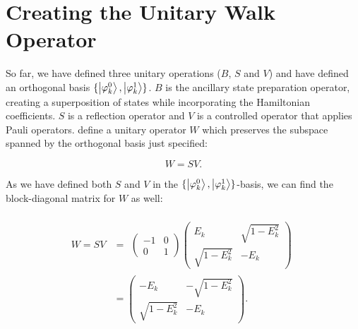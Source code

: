 \section{Creating the Unitary Walk Operator}

So far, we have defined three unitary operations ($B$, $S$ and $V$) and have defined an orthogonal basis $\{\left\vert{\varphi_k^0}\right\rangle, \left\vert{\varphi^1_k}\right\rangle\}$. $B$ is the ancillary state preparation operator, creating a superposition of states while incorporating the Hamiltonian coefficients. $S$ is a reflection operator and $V$ is a controlled operator that applies Pauli operators.
\textcite{poulin} define a unitary operator $W$ which preserves the subspace spanned by the orthogonal basis just specified:


%
%

\begin{equation}
W = SV.
\end{equation}

As we have defined both $S$ and $V$ in the $\{\left\vert{\varphi_k^0}\right\rangle, \left\vert{\varphi^1_k}\right\rangle\}$-basis, we can find the block-diagonal matrix for $W$ as well:

\begin{align} \begin{split}
W = SV &=
\begin{array}{l}
\left(\begin{array}{cc}
-1 & 0 \\
0 & 1
\end{array}\right) \left(\begin{array}{cc}
E_{k} & \sqrt{1-E_{k}^{2}} \\
\sqrt{1-E_{k}^{2}} & -E_{k}
\end{array}\right)
\end{array} \\
&= \left(\begin{array}{cc}
-E_{k} & -\sqrt{1-E_{k}^{2}} \\
\sqrt{1-E_{k}^{2}} & -E_{k}
\end{array}\right). \end{split}
\end{align}

